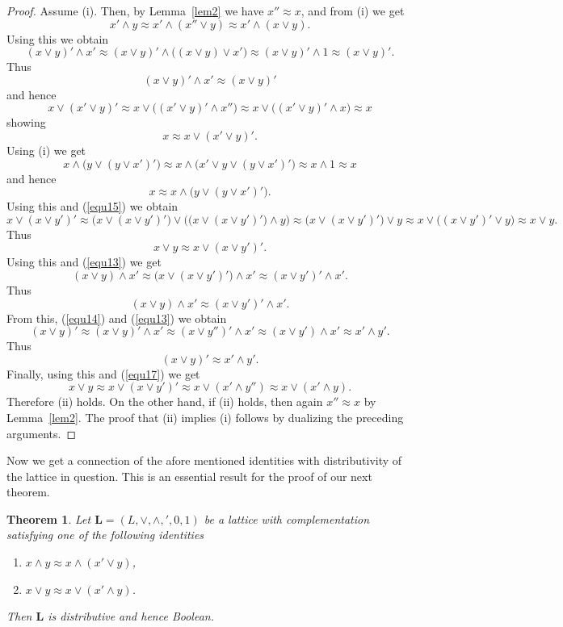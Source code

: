 \documentclass[12pt]{article}
\newtheorem{theorem}{Theorem}[section]
\begin{document}
\begin{proof}
Assume (i). Then, by Lemma~\ref{lem2} we have $x''\approx x$, and from (i) we get
\begin{equation}\label{equ13}
x'\wedge y\approx x'\wedge(x''\vee y)\approx x'\wedge(x\vee y).
\end{equation}
Using this we obtain
\[
(x\vee y)'\wedge x'\approx(x\vee y)'\wedge\big((x\vee y)\vee x'\big)\approx(x\vee y)'\wedge1\approx(x\vee y)'.
\]
Thus
\begin{equation}\label{equ14}
(x\vee y)'\wedge x'\approx(x\vee y)'
\end{equation}
and hence
\[
x\vee(x'\vee y)'\approx x\vee\big((x'\vee y)'\wedge x''\big)\approx x\vee\big((x'\vee y)'\wedge x\big)\approx x
\]
showing
\begin{equation}\label{equ15}
x\approx x\vee(x'\vee y)'.
\end{equation}
Using (i) we get
\[
x\wedge\big(y\vee(y\vee x')'\big)\approx x\wedge\big(x'\vee y\vee(y\vee x')'\big)\approx x\wedge1\approx x
\]
and hence
\[
x\approx x\wedge\big(y\vee(y\vee x')'\big).
\]
Using this and (\ref{equ15}) we obtain
\[
x\vee(x\vee y')'\approx\big(x\vee(x\vee y')'\big)\vee\Big(\big(x\vee(x\vee y')'\big)\wedge y\Big)\approx\big(x\vee(x\vee y')'\big)\vee y\approx x\vee\big((x\vee y')'\vee y\big)\approx x\vee y.
\]
Thus
\begin{equation}\label{equ17}
x\vee y\approx x\vee(x\vee y')'.
\end{equation}
Using this and (\ref{equ13}) we get
\[
(x\vee y)\wedge x'\approx\big(x\vee(x\vee y')'\big)\wedge x'\approx(x\vee y')'\wedge x'.
\]
Thus
\[
(x\vee y)\wedge x'\approx(x\vee y')'\wedge x'.
\]
From this, (\ref{equ14}) and (\ref{equ13}) we obtain
\[
(x\vee y)'\approx(x\vee y)'\wedge x'\approx(x\vee y'')'\wedge x'\approx(x\vee y')\wedge x'\approx x'\wedge y'.
\]
Thus
\[
(x\vee y)'\approx x'\wedge y'.
\]
Finally, using this and (\ref{equ17}) we get
\[
x\vee y\approx x\vee(x\vee y')'\approx x\vee(x'\wedge y'')\approx x\vee(x'\wedge y).
\]
Therefore (ii) holds. On the other hand, if (ii) holds, then again $x''\approx x$ by Lemma~\ref{lem2}. The proof that (ii) implies (i) follows by dualizing the preceding arguments.
\end{proof}

Now we get a connection of the afore mentioned identities with distributivity of the lattice in question. This is an essential result for the proof of our next theorem.

\begin{theorem}\label{th3}
Let $\mathbf L=(L,\vee,\wedge,{}',0,1)$ be a lattice with complementation satisfying one of the following identities
\begin{enumerate}[{\rm(i)}]
\item $x\wedge y\approx x\wedge(x'\vee y)$,
\item $x\vee y\approx x\vee(x'\wedge y)$.
\end{enumerate}
Then $\mathbf L$ is distributive and hence Boolean.
\end{theorem}
\end{document}
